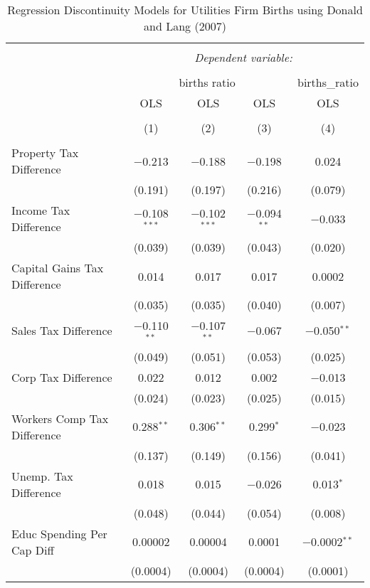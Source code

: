 
\begin{table}[!htbp] \centering 
  \caption{Regression Discontinuity Models for  Utilities Firm Births using Donald and Lang (2007)} 
  \label{} 
\begin{tabular}{@{\extracolsep{5pt}}lcccc} 
\\[-1.8ex]\hline 
\hline \\[-1.8ex] 
 & \multicolumn{4}{c}{\textit{Dependent variable:}} \\ 
\cline{2-5} 
\\[-1.8ex] & \multicolumn{3}{c}{births ratio} & births\_ratio \\ 
 & OLS & OLS & OLS & OLS \\ 
\\[-1.8ex] & (1) & (2) & (3) & (4)\\ 
\hline \\[-1.8ex] 
 Property Tax Difference & $-$0.213 & $-$0.188 & $-$0.198 & 0.024 \\ 
  & (0.191) & (0.197) & (0.216) & (0.079) \\ 
  Income Tax Difference & $-$0.108$^{***}$ & $-$0.102$^{***}$ & $-$0.094$^{**}$ & $-$0.033 \\ 
  & (0.039) & (0.039) & (0.043) & (0.020) \\ 
  Capital Gains Tax Difference & 0.014 & 0.017 & 0.017 & 0.0002 \\ 
  & (0.035) & (0.035) & (0.040) & (0.007) \\ 
  Sales Tax Difference & $-$0.110$^{**}$ & $-$0.107$^{**}$ & $-$0.067 & $-$0.050$^{**}$ \\ 
  & (0.049) & (0.051) & (0.053) & (0.025) \\ 
  Corp Tax Difference & 0.022 & 0.012 & 0.002 & $-$0.013 \\ 
  & (0.024) & (0.023) & (0.025) & (0.015) \\ 
  Workers Comp Tax Difference & 0.288$^{**}$ & 0.306$^{**}$ & 0.299$^{*}$ & $-$0.023 \\ 
  & (0.137) & (0.149) & (0.156) & (0.041) \\ 
  Unemp. Tax Difference & 0.018 & 0.015 & $-$0.026 & 0.013$^{*}$ \\ 
  & (0.048) & (0.044) & (0.054) & (0.008) \\ 
  Educ Spending Per Cap Diff & 0.00002 & 0.00004 & 0.0001 & $-$0.0002$^{**}$ \\ 
  & (0.0004) & (0.0004) & (0.0004) & (0.0001) \\ 

\end{tabular}
\end{table}
